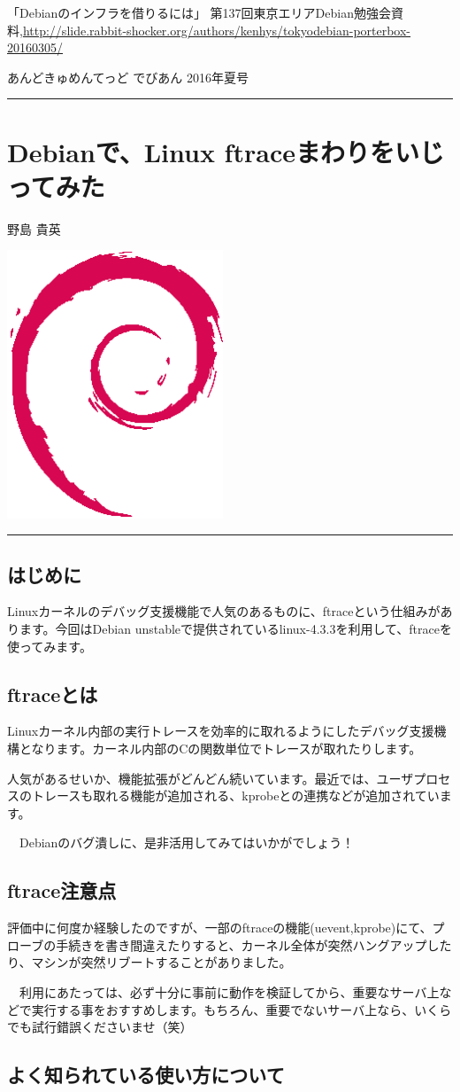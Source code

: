 \documentclass[mingoth,a4paper]{jsarticle}
\renewcommand{\dancersection}[2]{%
\newpage
あんどきゅめんてっど でびあん 2016年夏号
%
\vspace{0.1mm}\\
{\color{dancerdarkblue}\rule{\hsize}{2mm}}

%
%
\begin{minipage}[t]{0.6\hsize}
\color{dancerdarkblue}
\vspace{1cm}
\section{#1}
\hfill{}#2\\
\end{minipage}
\begin{minipage}[t]{0.4\hsize}
\vspace{-2cm}
\hfill{}\includegraphics[height=8cm]{image200502/openlogo-nd.eps}\\
\vspace{-5cm}
\end{minipage}
%
{\color{dancerlightblue}\rule{0.66\hsize}{2mm}}
%
\vspace{2cm}
}
\begin{document}
\begin{thebibliography}{1}
「Debianのインフラを借りるには」 第137回東京エリアDebian勉強会資料,\url{http://slide.rabbit-shocker.org/authors/kenhys/tokyodebian-porterbox-20160305/}
\end{thebibliography}

\dancersection{Debianで、Linux ftraceまわりをいじってみた}{野島 貴英}

\subsection{はじめに}

 Linuxカーネルのデバッグ支援機能で人気のあるものに、ftraceという仕組みがあります。今回はDebian unstableで提供されているlinux-4.3.3を利用して、ftraceを使ってみます。
  


\subsection{ftraceとは}

  Linuxカーネル内部の実行トレースを効率的に取れるようにしたデバッグ支援機構となります。カーネル内部のCの関数単位でトレースが取れたりします。

  人気があるせいか、機能拡張がどんどん続いています。最近では、ユーザプロセスのトレースも取れる機能が追加される、kprobeとの連携などが追加されています。

　Debianのバグ潰しに、是非活用してみてはいかがでしょう！
  


\subsection{ftrace注意点}

  評価中に何度か経験したのですが、一部のftraceの機能(uevent,kprobe)にて、プローブの手続きを書き間違えたりすると、カーネル全体が突然ハングアップしたり、マシンが突然リブートすることがありました。

　利用にあたっては、必ず十分に事前に動作を検証してから、重要なサーバ上などで実行する事をおすすめします。もちろん、重要でないサーバ上なら、いくらでも試行錯誤くださいませ（笑）
  


\subsection{よく知られている使い方について}
\end{document}
